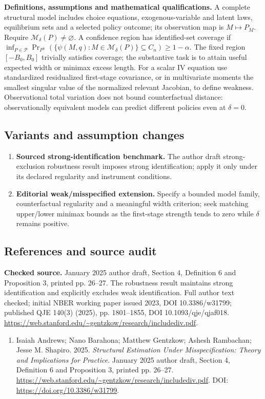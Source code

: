 \documentclass[11pt,a4paper]{article}
\begin{document}
\textbf{Definitions, assumptions and mathematical qualifications.} A complete structural model includes choice equations, exogenous-variable and latent laws, equilibrium sets and a selected policy outcome; its observation map is \(M\mapsto P_M\). Require \(\mathcal M_\delta(P)\ne\varnothing\). A confidence region has identified-set coverage if \(\inf_{P\in\mathcal P}\Pr_{P^n}(\{\psi(M,q):M\in\mathcal M_\delta(P)\}\subseteq C_n)\geq1-\alpha\). The fixed region \([-B_0,B_0]\) trivially satisfies coverage; the substantive task is to attain useful expected width or minimax excess length. For a scalar IV equation use standardized residualized first-stage covariance, or in multivariate moments the smallest singular value of the normalized relevant Jacobian, to define weakness. Observational total variation does not bound counterfactual distance: observationally equivalent models can predict different policies even at \(\delta=0\).
\subsection*{Variants and assumption changes}
\begin{enumerate}
\item \textbf{Sourced strong-identification benchmark.} The author draft strong-exclusion robustness result imposes strong identification; apply it only under its declared regularity and instrument conditions.
\item \textbf{Editorial weak/misspecified extension.} Specify a bounded model family, counterfactual regularity and a meaningful width criterion; seek matching upper/lower minimax bounds as the first-stage strength tends to zero while \(\delta\) remains positive.
\end{enumerate}
\subsection*{References and source audit}
\textbf{Checked source.} January 2025 author draft, Section 4, Definition 6 and Proposition 3, printed pp. 26--27. The robustness result maintains strong identification and explicitly excludes weak identification. Full author text checked; initial NBER working paper issued 2023, DOI 10.3386/w31799; published QJE 140(3) (2025), pp. 1801--1855, DOI 10.1093/qje/qjaf018. \url{https://web.stanford.edu/~gentzkow/research/includediv.pdf}.
\begin{enumerate}\raggedright
\item\hypertarget{definitions:source:30007708:1}{} Isaiah Andrews; Nano Barahona; Matthew Gentzkow; Ashesh Rambachan; Jesse M. Shapiro. 2025. \emph{Structural Estimation Under Misspecification: Theory and Implications for Practice}. January 2025 author draft, Section 4, Definition 6 and Proposition 3, printed pp. 26--27.
\url{https://web.stanford.edu/~gentzkow/research/includediv.pdf}.
DOI: \url{https://doi.org/10.3386/w31799}.
\end{enumerate}
\end{document}
